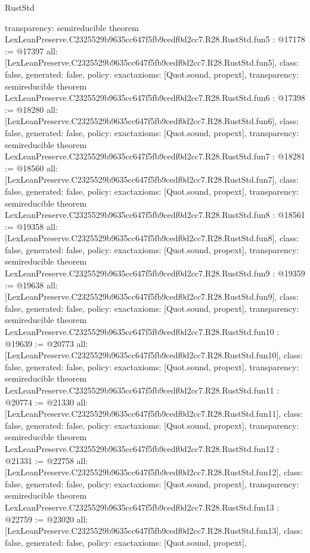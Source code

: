 \begin{lexlean}{RustStd}
\begin{coremodule}
{  transparency: semireducible
}
theorem LexLeanPreserve.C2325529b9635cc647f5fb9cedf0d2cc7.R28.RustStd.fun5 : @17178 := @17397 {
  all: [LexLeanPreserve.C2325529b9635cc647f5fb9cedf0d2cc7.R28.RustStd.fun5],
  class: false,
  generated: false,
  policy: exact{axioms: [Quot.sound, propext]},
  transparency: semireducible
}
theorem LexLeanPreserve.C2325529b9635cc647f5fb9cedf0d2cc7.R28.RustStd.fun6 : @17398 := @18280 {
  all: [LexLeanPreserve.C2325529b9635cc647f5fb9cedf0d2cc7.R28.RustStd.fun6],
  class: false,
  generated: false,
  policy: exact{axioms: [Quot.sound, propext]},
  transparency: semireducible
}
theorem LexLeanPreserve.C2325529b9635cc647f5fb9cedf0d2cc7.R28.RustStd.fun7 : @18281 := @18560 {
  all: [LexLeanPreserve.C2325529b9635cc647f5fb9cedf0d2cc7.R28.RustStd.fun7],
  class: false,
  generated: false,
  policy: exact{axioms: [Quot.sound, propext]},
  transparency: semireducible
}
theorem LexLeanPreserve.C2325529b9635cc647f5fb9cedf0d2cc7.R28.RustStd.fun8 : @18561 := @19358 {
  all: [LexLeanPreserve.C2325529b9635cc647f5fb9cedf0d2cc7.R28.RustStd.fun8],
  class: false,
  generated: false,
  policy: exact{axioms: [Quot.sound, propext]},
  transparency: semireducible
}
theorem LexLeanPreserve.C2325529b9635cc647f5fb9cedf0d2cc7.R28.RustStd.fun9 : @19359 := @19638 {
  all: [LexLeanPreserve.C2325529b9635cc647f5fb9cedf0d2cc7.R28.RustStd.fun9],
  class: false,
  generated: false,
  policy: exact{axioms: [Quot.sound, propext]},
  transparency: semireducible
}
theorem LexLeanPreserve.C2325529b9635cc647f5fb9cedf0d2cc7.R28.RustStd.fun10 : @19639 := @20773 {
  all: [LexLeanPreserve.C2325529b9635cc647f5fb9cedf0d2cc7.R28.RustStd.fun10],
  class: false,
  generated: false,
  policy: exact{axioms: [Quot.sound, propext]},
  transparency: semireducible
}
theorem LexLeanPreserve.C2325529b9635cc647f5fb9cedf0d2cc7.R28.RustStd.fun11 : @20774 := @21330 {
  all: [LexLeanPreserve.C2325529b9635cc647f5fb9cedf0d2cc7.R28.RustStd.fun11],
  class: false,
  generated: false,
  policy: exact{axioms: [Quot.sound, propext]},
  transparency: semireducible
}
theorem LexLeanPreserve.C2325529b9635cc647f5fb9cedf0d2cc7.R28.RustStd.fun12 : @21331 := @22758 {
  all: [LexLeanPreserve.C2325529b9635cc647f5fb9cedf0d2cc7.R28.RustStd.fun12],
  class: false,
  generated: false,
  policy: exact{axioms: [Quot.sound, propext]},
  transparency: semireducible
}
theorem LexLeanPreserve.C2325529b9635cc647f5fb9cedf0d2cc7.R28.RustStd.fun13 : @22759 := @23020 {
  all: [LexLeanPreserve.C2325529b9635cc647f5fb9cedf0d2cc7.R28.RustStd.fun13],
  class: false,
  generated: false,
  policy: exact{axioms: [Quot.sound, propext]},
}
\end{coremodule}
\end{lexlean}
